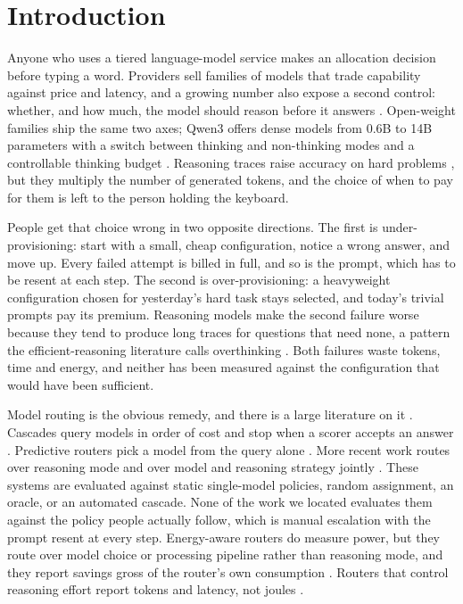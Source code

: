 \documentclass[final,5p,times,twocolumn]{elsarticle}
\theoremstyle{plain}
\begin{document}
\section{Introduction}
\label{sec:introduction}

Anyone who uses a tiered language-model service makes an allocation decision
before typing a word. Providers sell families of models that trade
capability against price and latency, and a growing number also expose a
second control: whether, and how much, the model should reason before it
answers \cite{openai_reasoning,anthropic_effort,google_thinking}. Open-weight
families ship the same two axes; Qwen3 offers dense models from 0.6B to 14B
parameters with a switch between thinking and non-thinking modes and a
controllable thinking budget \cite{qwen3}. Reasoning traces raise accuracy on
hard problems \cite{wei2022cot,deepseek2025r1}, but they multiply the number
of generated tokens, and the choice of when to pay for them is left to the
person holding the keyboard.

People get that choice wrong in two opposite directions. The first is
under-provisioning: start with a small, cheap configuration, notice a wrong
answer, and move up. Every failed attempt is billed in full, and so is the
prompt, which has to be resent at each step. The second is
over-provisioning: a heavyweight configuration chosen for yesterday's hard
task stays selected, and today's trivial prompts pay its premium. Reasoning
models make the second failure worse because they tend to produce long traces
for questions that need none, a pattern the efficient-reasoning literature
calls overthinking \cite{sui2025stopoverthinking,alomrani2025reasoningbudget}.
Both failures waste tokens, time and energy, and neither has been measured
against the configuration that would have been sufficient.

Model routing is the obvious remedy, and there is a large literature on it
\cite{moslem2026routingsurvey}. Cascades query models in order of cost and
stop when a scorer accepts an answer \cite{chen2023frugalgpt,aggarwal2024automix}.
Predictive routers pick a model from the query alone
\cite{ding2024hybridllm,ong2024routellm}. More recent work routes over
reasoning mode \cite{zhang2025synapseroute,lee2026dart} and over model and
reasoning strategy jointly \cite{pan2026routetoreason}. These systems are
evaluated against static single-model policies, random assignment, an oracle,
or an automated cascade. None of the work we located evaluates them against
the policy people actually follow, which is manual escalation with the prompt
resent at every step. Energy-aware routers do measure power, but they route
over model choice or processing pipeline rather than reasoning mode, and they
report savings gross of the router's own consumption
\cite{ziller2026greenserv,li2026ecothink}. Routers that control reasoning
effort report tokens and latency, not joules \cite{lee2026dart}.
\end{document}
